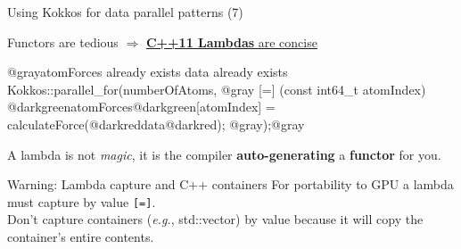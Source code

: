 \begin{frame}[fragile]{Using Kokkos for data parallel patterns (7)}

  Functors are tedious $\Rightarrow$ \ul{\textbf{C++11 Lambdas} are concise}

  \vspace{5pt}

  \begin{code}[linebackgroundcolor={
        \btLstHL<1->{4-6}{black!15}
      },
      keywords={}, frame=single]
@grayatomForces already exists
data already exists
Kokkos::parallel_for(numberOfAtoms, @gray
    [=] (const int64_t atomIndex) {
    @darkgreenatomForces@darkgreen[atomIndex] = calculateForce(@darkreddata@darkred);
  }
@gray);@gray
  \end{code}

  \pause

  A lambda is not \textit{magic}, it is the compiler \textbf{auto-generating} a \textbf{functor} for you.

  \pause
  \vspace{7pt}

  \begin{alertblock}{Warning: Lambda capture and C++ containers}
    For portability to GPU a lambda must capture by value \texttt{[=]}. \\
    Don't capture containers (\textit{e.g.}, std::vector)
    by value because it will copy the container's entire contents.
  \end{alertblock}


\end{frame}


